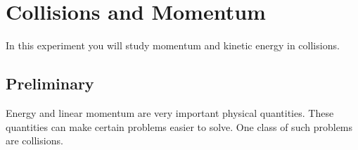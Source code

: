 \setcounter{chapter}{9}
\chapter{Collisions and Momentum}
In this experiment you will study momentum and kinetic energy in collisions.
\section{Preliminary}
Energy and linear momentum are very important physical quantities. These quantities can make certain problems easier to solve. One class of such problems are collisions.


